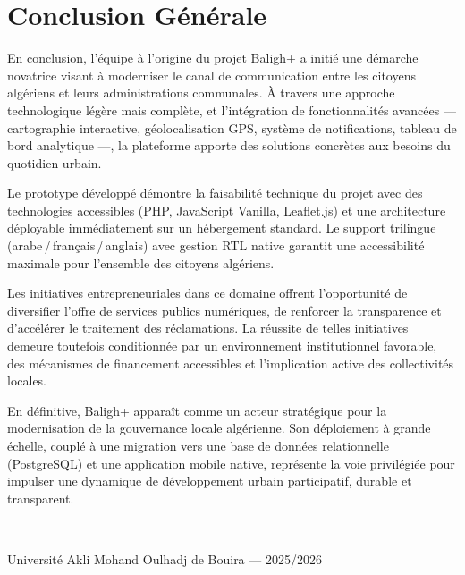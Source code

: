 \documentclass[12pt,a4paper]{report}
\begin{document}
\chapter*{Conclusion Générale}

En conclusion, l'équipe à l'origine du projet Baligh+ a initié une démarche
novatrice visant à moderniser le canal de communication entre les citoyens
algériens et leurs administrations communales. À travers une approche
technologique légère mais complète, et l'intégration de fonctionnalités
avancées — cartographie interactive, géolocalisation GPS, système de
notifications, tableau de bord analytique —, la plateforme apporte des
solutions concrètes aux besoins du quotidien urbain.

Le prototype développé démontre la faisabilité technique du projet avec des
technologies accessibles (PHP, JavaScript Vanilla, Leaflet.js) et une
architecture déployable immédiatement sur un hébergement standard. Le support
trilingue (arabe\,/\,français\,/\,anglais) avec gestion RTL native garantit
une accessibilité maximale pour l'ensemble des citoyens algériens.

Les initiatives entrepreneuriales dans ce domaine offrent l'opportunité de
diversifier l'offre de services publics numériques, de renforcer la
transparence et d'accélérer le traitement des réclamations. La réussite de
telles initiatives demeure toutefois conditionnée par un environnement
institutionnel favorable, des mécanismes de financement accessibles et
l'implication active des collectivités locales.

En définitive, Baligh+ apparaît comme un acteur stratégique pour la
modernisation de la gouvernance locale algérienne. Son déploiement à grande
échelle, couplé à une migration vers une base de données relationnelle
(PostgreSQL) et une application mobile native, représente la voie privilégiée
pour impulser une dynamique de développement urbain participatif, durable et
transparent.

\vfill
\begin{center}
  \rule{0.5\linewidth}{0.4pt}\\[0.3cm]
  {\small Université Akli Mohand Oulhadj de Bouira — 2025/2026}
\end{center}
\end{document}
